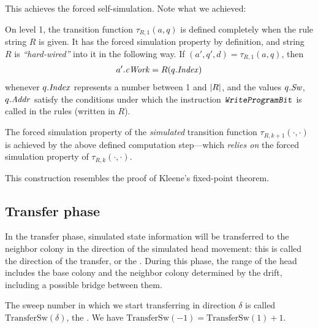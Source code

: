 \documentclass[12pt]{memoir}
\newcommand{\fld}[1]{\ensuremath{\textit{#1\/}}}
\newcommand{\rul}[1]{\ensuremath{\texttt{\slshape #1\/}}}
\newcommand{\Addr}{\fld{Addr}}
\newcommand{\Index}{\fld{Index}}
\newcommand{\Sweep}{\fld{Sw}}
\newcommand{\cWork}{\fld{cWork}}
\newcommand{\TransferSw}{\mathrm{TransferSw}}
\newcommand{\WriteProgramBit}{\rul{WriteProgramBit}}
\begin{document}
This achieves the forced self-simulation.
Note what we achieved:

\begin{itemize}
  \begin{sloppypar}
\item On level 1, the transition function \( \tau_{R,1}(a,q) \) is defined completely
when the rule string \( R \) is given.
It has the forced simulation property by definition, and
string \( R \) is \emph{``hard-wired''} into it in the following way.
If \( (a',q',d)=\tau_{R,1}(a,q) \), then
\begin{align*}
  a'.\cWork=R(q.\Index)
\end{align*}
whenever \( q.\Index \) represents a number between 1 and \( \lvert R \rvert \),
and the values \( q.\Sweep \), \( q.\Addr \) satisfy the conditions
under which the instruction \( \WriteProgramBit \) is 
called in the rules (written in \( R \)).
      \end{sloppypar}

      \begin{sloppypar}
\item The forced simulation property of the \emph{simulated}
transition function \( \tau_{R,k+1}(\cdot,\cdot) \) is 
achieved by the above defined computation 
step---which \emph{relies on} the forced simulation property of \( \tau_{R,k}(\cdot,\cdot) \).
              \end{sloppypar}
\end{itemize}

\begin{remark}
This construction resembles the proof of Kleene's fixed-point theorem.
\end{remark}



\subsection{Transfer phase}\label{sec:TransferPhase}

In the transfer phase, simulated state information will be transferred to the
neighbor colony in the direction of the simulated head movement: this is
called the direction of the transfer, or the .
During this phase, the range of the head
includes the base colony and the neighbor colony
determined by the drift, including a possible bridge between them.

\begin{sloppypar}
The sweep number in which we start transferring in direction \( \delta \) is called
\( \TransferSw(\delta) \), the .
We have \( \TransferSw(-1) =\TransferSw(1)+1 \).  
\end{sloppypar}
\end{document}
